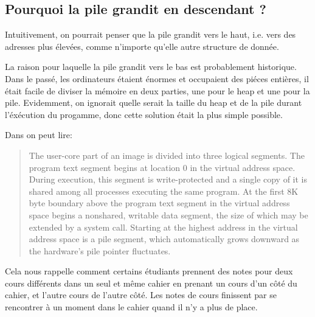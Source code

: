 
\subsection{Pourquoi la pile grandit en descendant ?}
\label{stack_grow_backwards}

Intuitivement, on pourrait penser que la pile grandit vers le haut, i.e. vers des adresses plus élevées, comme n'importe qu'elle autre structure de donnée.

La raison pour laquelle la pile grandit vers le bas est probablement historique.
Dans le passé, les ordinateurs étaient énormes et occupaient des piéces entières, il était facile de diviser la mémoire en deux parties, une pour le \gls{heap} et une pour la pile.
Evidemment, on ignorait quelle serait la taille du \gls{heap} et de la pile durant l'éxécution du progamme, donc cette solution était la plus simple possible.



Dans \RitchieThompsonUNIX on peut lire:

\begin{framed}
\begin{quotation}
The user-core part of an image is divided into three logical segments. The program text segment begins at location 0 in the virtual address space. During execution, this segment is write-protected and a single copy of it is shared among all processes executing the same program. At the first 8K byte boundary above the program text segment in the virtual address space begins a nonshared, writable data segment, the size of which may be extended by a system call. Starting at the highest address in the virtual address space is a pile segment, which automatically grows downward as the hardware's pile pointer fluctuates.
\end{quotation}
\end{framed}

Cela nous rappelle comment certains étudiants prennent des notes pour deux cours différents dans
un seul et même cahier en prenant un cours d'un côté du cahier, et l'autre cours de l'autre côté.
Les notes de cours finissent par se rencontrer à un moment dans le cahier quand il n'y a plus de place.

